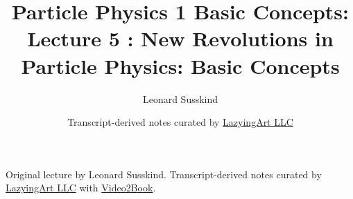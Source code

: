\documentclass[11pt,oneside]{book}
\begin{document}
\frontmatter
\title{Particle Physics 1 Basic Concepts: Lecture 5 : New Revolutions in Particle Physics: Basic Concepts}
\author{Leonard Susskind}
\date{Transcript-derived notes curated by \href{https://lazying.art}{LazyingArt LLC}}
\maketitle
\begin{center}
\small Original lecture by Leonard Susskind. Transcript-derived notes curated by \href{https://lazying.art}{LazyingArt LLC} with \href{https://github.com/lachlanchen/Video2Book}{Video2Book}.
\end{center}
\clearpage
\mainmatter

\end{document}
